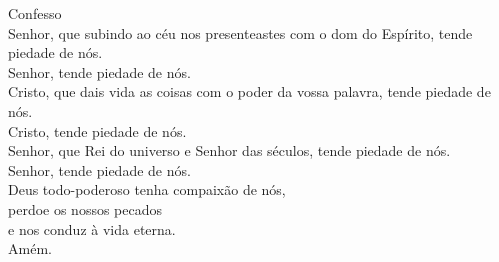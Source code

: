 \textcolor{VioletRed1}{Confesso}
\vspace{0.2cm} \\
\VbarRed{} Senhor, que subindo ao céu nos presenteastes com o dom do Espírito, tende piedade de nós.\\
\RbarRed{} Senhor, tende piedade de nós.
\vspace{0.1cm} \\
\VbarRed{} Cristo, que dais vida as coisas com o poder da vossa palavra, tende piedade de nós.\\
\RbarRed{} Cristo, tende piedade de nós.
\vspace{0.1cm} \\
\VbarRed{} Senhor, que Rei do universo e Senhor das séculos, tende piedade de nós.\\
\RbarRed{} Senhor, tende piedade de nós.
\vspace{0.1cm} \\
Deus todo-poderoso tenha compaixão de nós, \\
perdoe os nossos pecados \\
e nos conduz à vida eterna. \\
\RbarRed{} Amém.
\vspace{0.2cm} \\
